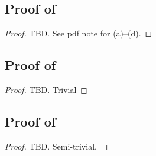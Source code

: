 \subsection{Proof of}
\begin{proof}
    TBD. See pdf note for (a)--(d).
\end{proof}

\subsection{Proof of}
\begin{proof}
    TBD. Trivial
\end{proof}

\subsection{Proof of}
\begin{proof}
    TBD. Semi-trivial.
\end{proof}


